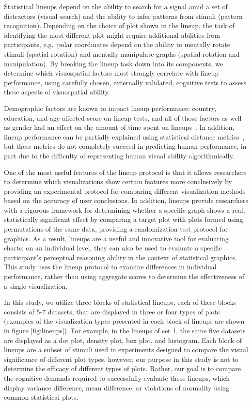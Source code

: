 \documentclass[journal]{vgtc}\usepackage[]{graphicx}\usepackage[]{color}
\begin{document}
Statistical lineups depend on the ability to search for a signal amid a set of distractors (visual search) and the ability to infer patterns from stimuli (pattern recognition). Depending on the choice of plot shown in the lineup, the task of identifying the most different plot might require additional abilities from participants, e.g.~polar coordinates depend on the ability to mentally rotate stimuli (spatial rotation) and mentally manipulate graphs (spatial rotation and manipulation). By breaking the lineup task down into its components, we  determine which visuospatial factors most strongly correlate with lineup performance, using carefully chosen, externally validated, cognitive tests to assess these aspects of visuospatial ability. 

Demographic factors are known to impact lineup performance: country, education, and age affected score on lineup tests, and all of those factors as well as gender had an effect on the amount of time spent on lineups~\cite{humanfactorslineups}. In addition, lineup performance can be partially explained using statistical distance metrics~\cite{distancemetriclineups}, but these metrics do not completely succeed in predicting human performance, in part due to the difficulty of representing human visual ability algorithmically.

One of the most useful features of the lineup protocol is that it allows researchers to determine which visualizations show certain features more conclusively by providing an experimental protocol for comparing different visualization methods based on the accuracy of user conclusions. In addition, lineups provide researchers with a rigorous framework for determining whether a specific graph shows a real, statistically significant effect by comparing a target plot with plots formed using permutations of the same data, providing a randomization test protocol for graphics. As a result, lineups are a useful and innovative tool for evaluating charts; on an individual level, they can also be used to evaluate a specific participant's perceptual reasoning ability in the context of statistical graphics.
This study uses the lineup protocol to examine differences in individual performance, rather than using aggregate scores to determine the effectiveness of a single visualization. 


In this study, we utilize three blocks of statistical lineups; each of these blocks consists of 5-7 datasets, that are displayed in three or four types of plots (examples of the visualization types presented in each block of lineups are shown in figure \ref{fig:lineups}). For example, in the lineups of set 1, the same five datasets are displayed as a dot plot, density plot, box plot, and histogram. Each block of lineups are a subset of stimuli used in experiments designed to compare the visual significance of different plot types, however, our purpose in this study is not to determine the efficacy of different types of plots. Rather, our goal is to compare the cognitive demands required to successfully evaluate these lineups, which display variance difference, mean difference, or violations of normality using common statistical plots.
\end{document}
